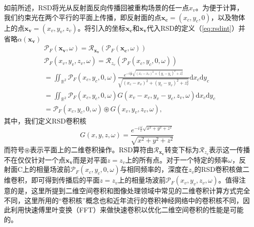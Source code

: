 \documentclass[master]{shtthesis}             %
\begin{document}
如前所述，RSD将光从反射面反向传播回被重构场景的任一点$x_v$。为便于计算，我们约束光在两个平行的平面上传播，即反射面的点$\mathbf{x_c}=(x_c,y_c,0)$，以及物体上的点$\mathbf{x_v}=(x_v,y_v,z_v)$。将引入的坐标$\mathbf{x_c}$和$\mathbf{x_v}$代入RSD的定义（\ref{eq:rsdint}）并省略$\alpha(\mathbf{x_v})$
\begin{equation}\label{eq:rsdconv}
  \begin{split}
    &\mathcal{P}_F(\mathbf{x_v},\omega) = \mathcal{R}_{\mathbf{x_v}}\left( \mathcal{P}_F(\mathbf{x_c},\omega) \right) \\
    &\mathcal{P}_F(x_v,y_v,z_v,\omega) = \mathcal{R}_{z_v}\left( \mathcal{P}_F(x_c,y_c,0,\omega) \right)\\
    &= \iint_{\mathbb{R}^2}\mathcal{P}_F(x_c,y_c,0,\omega)\frac{e^{-i\frac{\omega}{c}\sqrt{(x_c-x_v)^2+(y_c-y_v)^2+z_v^2}}}{\sqrt{(x_c-x_v)^2+(y_c-y_v)^2+z_v^2}} \text{d}x_c\text{d}y_c \\
    &= \iint_{\mathbb{R}^2}\mathcal{P}_F(x_c,y_c,0,\omega) G(x_v-x_c,y_v-y_c,z_v,\omega) \text{d}x_c\text{d}y_c \\
    &= \mathcal{P}_F(x_c,y_c,0,\omega) \circledast G(x_v,y_v,z_v,\omega),
  \end{split}
\end{equation}
其中，我们定义RSD卷积核
\begin{equation}
  G(x,y,z,\omega) = \frac{e^{-i\frac{\omega}{c}\sqrt{x^2+y^2+z^2}}}{\sqrt{x^2+y^2+z^2}}
\end{equation}
而符号$\circledast$表示平面上的二维卷积操作。RSD算符由$\mathcal{R}_{\mathbf{x_v}}$转变下标为$\mathcal{R}_{z_v}$表示这一传播不在仅仅针对一个点$\mathbf{x_v}$而是对平面$z=z_v$上的所有点。对于一个特定的频率$\omega$，反射面C上的相量场波前$\mathcal{P}_F(x_c,y_c,0,\omega)$与相同频率的，深度在$z_v$的RSD卷积核做二维卷积，即可得到传播后的平面$z=z_v$上的相量场波前$\mathcal{P}_F(x_v,y_v,z_v,\omega)$。值得注意的是，这里所提到二维空间卷积和图像处理领域中常见的二维卷积计算方式完全不同，这里所用的“卷积核”概念也和近年流行的卷积神经网络中的卷积核不同，因此利用快速傅里叶变换（FFT）来做快速卷积以优化二维空间卷积的性能是可能的。

\end{document}
